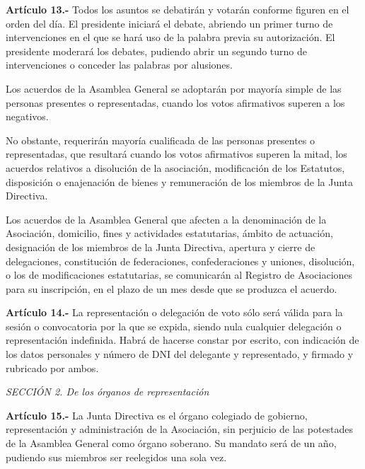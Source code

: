 \documentclass[a4paper,12pt]{article}
\begin{document}
\begin{onehalfspace}
\bigskip\bigskip

\textbf{Art\'iculo 13.-} Todos los asuntos se debatir\'an y votar\'an conforme figuren en el orden del d\'ia. El presidente iniciar\'a el debate, abriendo un primer turno de intervenciones en el que se har\'a uso de la palabra previa su autorizaci\'on. El presidente moderar\'a los debates, pudiendo abrir un segundo turno de intervenciones o conceder las palabras por alusiones.

Los acuerdos de la Asamblea General se adoptar\'an por mayor\'ia simple de las personas presentes o representadas, cuando los votos afirmativos superen a los negativos.

No obstante, requerir\'an mayor\'ia cualificada de las personas presentes o representadas, que resultar\'a cuando los votos afirmativos superen la mitad, los acuerdos relativos a disoluci\'on de la asociaci\'on, modificaci\'on de los Estatutos, disposici\'on o enajenaci\'on de bienes y remuneraci\'on de los miembros de la Junta Directiva.

Los acuerdos de la Asamblea General que afecten a la denominaci\'on de la Asociaci\'on, domicilio, fines y actividades estatutarias, \'ambito de actuaci\'on, designaci\'on de los miembros de la Junta Directiva, apertura y cierre de delegaciones, constituci\'on de federaciones, confederaciones y uniones, disoluci\'on, o los de modificaciones estatutarias, se comunicar\'an al Registro de Asociaciones para su inscripci\'on, en el plazo de un mes desde que se produzca el acuerdo.

\bigskip\bigskip

\textbf{Art\'iculo 14.-} La representaci\'on o delegaci\'on de voto s\'olo ser\'a v\'alida para la sesi\'on o convocatoria por la que se expida, siendo nula cualquier delegaci\'on o representaci\'on indefinida. Habr\'a de hacerse constar por escrito, con indicaci\'on de los datos personales y n\'umero de DNI del delegante y representado, y firmado y rubricado por ambos.

\bigskip\bigskip

\textit{SECCI\'ON 2\textordfeminine. De los \'organos de representaci\'on}

\bigskip\bigskip

\textbf{Art\'iculo 15.-} La Junta Directiva es el \'organo colegiado de gobierno, representaci\'on y administraci\'on de la Asociaci\'on, sin perjuicio de las potestades de la Asamblea General como \'organo soberano. Su mandato ser\'a de un a\~no, pudiendo sus miembros ser reelegidos una sola vez.


\end{onehalfspace}
\end{document}

